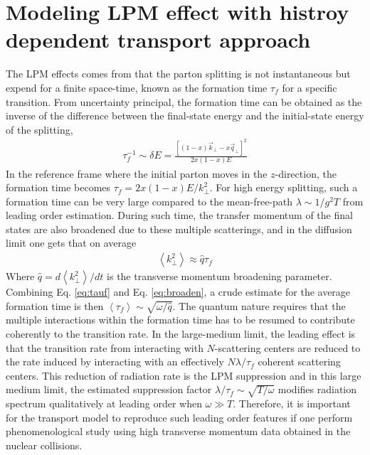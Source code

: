 \documentclass[aps, prc, reprint, amsmath, groupedaddress, nofootinbib]{revtex4-1}
\begin{document}
\section{Modeling LPM effect with histroy dependent transport approach}\label{section:modified-Boltzmann}
The LPM effects comes from that the parton splitting is not instantaneous but expend for a finite space-time, known as the formation time $\tau_f$ for a specific transition.
From uncertainty principal, the formation time can be obtained as the inverse of the difference between the final-state energy and the initial-state energy of the splitting,
\begin{eqnarray}
\tau_f^{-1} \sim \delta E = \frac{[(1-x)\vec{k}_\perp - x\vec{q}_\perp]^2}{2x(1-x)E} 
\label{eq:tauf}
\end{eqnarray}
In the reference frame where the initial parton moves in the $z$-direction, the formation time becomes $\tau_f = 2x(1-x)E/k_\perp^2$.
For high energy splitting, such a formation time can be very large compared to the mean-free-path $\lambda \sim 1/g^2T$ from leading order estimation.
During such time, the transfer momentum of the final states are also broadened due to these multiple scatterings, and in the diffusion limit one gets that on average
\begin{eqnarray}
\left\langle k_\perp^2 \right\rangle \approx \hat{q} \tau_f \label{eq:broaden}
\end{eqnarray}
Where $\hat{q} = d \left\langle k_\perp^2 \right\rangle / dt$ is the transverse momentum broadening parameter.
Combining Eq. \ref{eq:tauf} and Eq. \ref{eq:broaden}, a crude estimate for the average formation time is then $\left\langle \tau_f \right\rangle \sim \sqrt{\omega/\hat{q}}$.
The quantum nature requires that the multiple interactions within the formation time has to be resumed to contribute coherently to the transition rate.
In the large-medium limit, the leading effect is that the transition rate from interacting with $N$-scattering centers are reduced to the rate induced by interacting with an effectively $N\lambda/\tau_f$ coherent scattering centers. 
This reduction of radiation rate is the LPM suppression and in this large medium limit, the estimated suppression factor $\lambda/\tau_f \sim \sqrt{T/\omega}$ modifies radiation spectrum qualitatively at leading order when $\omega \gg T$.
Therefore, it is important for the transport model to reproduce such leading order features if one perform phenomenological study using high transverse momentum data obtained in the nuclear collisions.
\end{document}
